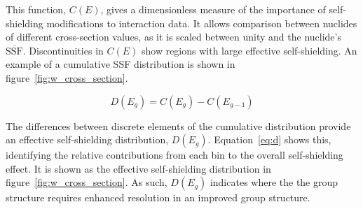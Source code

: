This function, $C(E)$, gives a dimensionless measure of the importance of self-shielding modifications to interaction data. It allows comparison between nuclides of different cross-section values, as it is scaled between unity and the nuclide's $\overline{\mathrm{SSF}}$. Discontinuities in $C(E)$ show regions with large effective self-shielding. An example of a cumulative SSF distribution is shown in figure~\ref{fig:w_cross_section}. 

\begin{equation}
  \label{eq:d}
  D(E_{g}) = C(E_{g}) - C(E_{g-1})
\end{equation}

The differences between discrete elements of the cumulative distribution provide an effective self-shielding distribution, $D(E_{g})$. Equation~\ref{eq:d} shows this, identifying the relative contributions from each bin to the overall self-shielding effect. It is shown as the effective self-shielding distribution in figure~\ref{fig:w_cross_section}. As such, $D(E_{g})$ indicates where the the group structure requires enhanced resolution in an improved group structure. 

